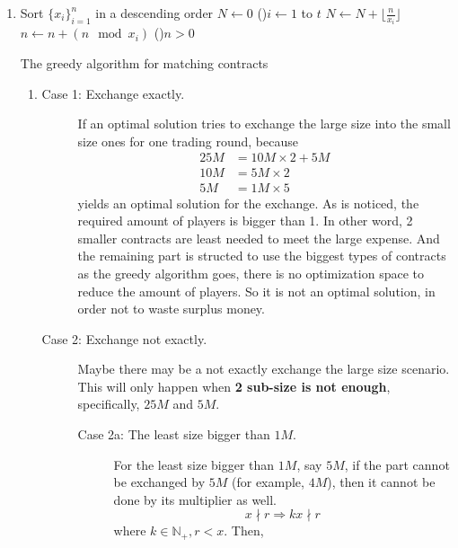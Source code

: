 \documentclass[12pt,a4paper]{article}
\makeatletter
\newtheorem*{solution}{Solution}
\theoremstyle{definition}
\renewenvironment{solution}[1][Solution] {\par\pushQED{\qed}\normalfont\topsep6\p@\@plus6\p@\relax\trivlist\item[\hskip\labelsep\bfseries#1\@addpunct{.}]\ignorespaces}{\popQED\endtrivlist\@endpefalse} \makeatother
\makeatother
\begin{document}
\begin{enumerate}
\begin{solution}
		\begin{minipage}{0.94\textwidth}
		\begin{algorithm}[H]
			\BlankLine
			Sort $\{x_i\}_{i=1}^n$ in a descending order\;
			$N\leftarrow 0$\;
			\For(){$i\leftarrow 1$ to $t$}{
				$N\leftarrow N + \lfloor \frac{n}{x_i}\rfloor$\;
				$n\leftarrow n + (n \mod x_i)$\;
			}
			\If(){$n>0$}{
				\;
			}
			\;
			\caption{The greedy algorithm for matching contracts}
		\end{algorithm}
		\end{minipage}
        \begin{enumerate}
		   \item \begin{description}
			   \item[Case 1: Exchange exactly.] If an optimal solution tries to exchange the large size into the small size ones for one trading round, because
			   \begin{align*}
				   25M &= 10M \times 2 + 5M\\
				   10M &= 5M\times 2\\
				   5M &= 1M \times 5
			   \end{align*}
			   yields an optimal solution for the exchange. As is noticed, the required amount of players is bigger than 1. In other word, 2 smaller contracts are least needed to meet the large expense. And the remaining part is structed to use the biggest types of contracts as the greedy algorithm goes, there is no optimization space to reduce the amount of players. So it is not an optimal solution, in order not to waste surplus money.
			   \item[Case 2: Exchange not exactly.] Maybe there may be a not exactly exchange the large size scenario. This will only happen when \textbf{2 sub-size is not enough}, specifically, $25M$ and $5M$. 
			   \begin{description}
				   \item[Case 2a: The least size bigger than $1M$.] For the least size bigger than $1M$, say $5M$, if the part cannot be exchanged by $5M$ (for example, $4M$), then it cannot be done by its multiplier as well.
				   \begin{equation*}
					   x \nmid r \Rightarrow kx \nmid r
				   \end{equation*}
				   where $k\in \mathbb{N}_+, r<x$. Then,

\end{description}
\end{description}
\end{enumerate}
\end{solution}
\end{enumerate}
\end{document}
